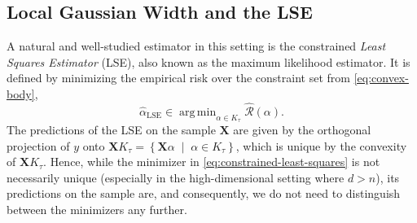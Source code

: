 \documentclass[a4paper]{article}
\newcommand{\mathset}[1]{\left\{#1\right\}}
\newcommand{\setmid}[0]{\;\middle|\;}
\newcommand{\X}[0]{\mathbf{X}}
\newcommand{\cR}[0]{\mathcal{R}}
\newcommand{\ha}[0]{\widehat{\alpha}}
\DeclareMathOperator{\LSEOp}{LSE}
\newcommand{\haLSE}[0]{\ha_{{\LSEOp}}}
\newcommand{\Kt}[0]{K_\tau}
\DeclareMathOperator*{\argmin}{arg\,min}
\newcommand{\Rhat}[0]{\widehat{\cR}}
\theoremstyle{thmstyle}
\theoremstyle{defstyle}
\theoremstyle{remark}
\begin{document}
\subsection{Local Gaussian Width and the LSE}

A natural and well-studied estimator in this setting is the constrained \emph{Least Squares Estimator} (LSE), also known as the maximum likelihood estimator. It is defined by minimizing the empirical risk over the constraint set from \eqref{eq:convex-body}, 
\begin{equation}
\label{eq:constrained-least-squares}
    \haLSE\in\argmin_{\alpha\in \Kt} \Rhat(\alpha).
\end{equation}
The predictions of the LSE on the sample $\X$ are given by the orthogonal projection of $y$ onto $\X \Kt=\mathset{\X\alpha\setmid \alpha\in \Kt}$, which is unique by the convexity of $\X \Kt$. Hence, while the minimizer in \cref{eq:constrained-least-squares} is not necessarily unique (especially in the high-dimensional setting where $d> n$), its predictions on the sample are, and consequently, we do not need to distinguish between the minimizers any further.
\end{document}
